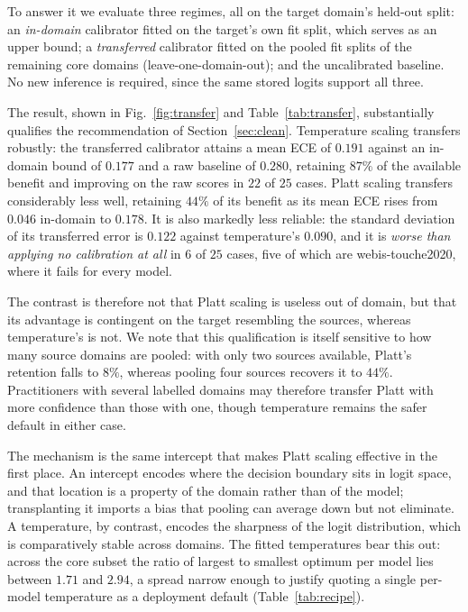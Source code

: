 \documentclass[sn-mathphys-num,pdflatex]{sn-jnl}
\begin{document}
To answer it we evaluate three regimes, all on the target domain's held-out split:
an \emph{in-domain} calibrator fitted on the target's own fit split, which serves
as an upper bound; a \emph{transferred} calibrator fitted on the pooled fit splits
of the remaining core domains (leave-one-domain-out); and the uncalibrated
baseline. No new inference is required, since the same stored logits support all
three.

The result, shown in Fig.~\ref{fig:transfer} and Table~\ref{tab:transfer},
substantially qualifies the recommendation of Section~\ref{sec:clean}. Temperature
scaling transfers robustly: the transferred calibrator attains a mean ECE of
$0.191$ against an in-domain bound of $0.177$ and a raw baseline of $0.280$,
retaining $87\%$ of the available benefit and improving on the raw scores in $22$
of $25$ cases. Platt scaling transfers considerably less well, retaining $44\%$ of
its benefit as its mean ECE rises from $0.046$ in-domain to $0.178$. It is also
markedly less reliable: the standard deviation of its transferred error is $0.122$
against temperature's $0.090$, and it is \emph{worse than applying no calibration
at all} in $6$ of $25$ cases, five of which are webis-touche2020, where it fails for
every model.

The contrast is therefore not that Platt scaling is useless out of domain, but that
its advantage is contingent on the target resembling the sources, whereas
temperature's is not. We note that this qualification is itself sensitive to how
many source domains are pooled: with only two sources available, Platt's retention
falls to $8\%$, whereas pooling four sources recovers it to $44\%$. Practitioners
with several labelled domains may therefore transfer Platt with more confidence than
those with one, though temperature remains the safer default in either case.

The mechanism is the same intercept that makes Platt scaling effective in the first
place. An intercept encodes where the decision boundary sits in logit space, and
that location is a property of the domain rather than of the model; transplanting it
imports a bias that pooling can average down but not eliminate. A temperature, by
contrast, encodes the sharpness of the logit distribution, which is comparatively
stable across domains. The fitted temperatures bear this out: across the core subset
the ratio of largest to smallest optimum per model lies between $1.71$ and $2.94$, a
spread narrow enough to justify quoting a single per-model temperature as a
deployment default (Table~\ref{tab:recipe}).
\end{document}
